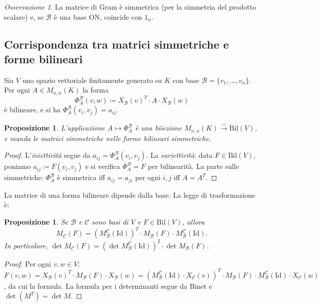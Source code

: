 \documentclass[11pt, a4paper]{book}
\theoremstyle{definition}
\theoremstyle{plain}
\newtheorem{proposizione}[definizione]{Proposizione}
\theoremstyle{remark}
\newtheorem{osservazione}[definizione]{Osservazione}
\newcommand{\Id}{\mathrm{Id}}
\begin{document}
\begin{osservazione}
La matrice di Gram è simmetrica (per la simmetria del prodotto scalare) e, se $\mathcal{B}$ è una base ON, coincide con $1_n$.
\end{osservazione}

\subsection{Corrispondenza tra matrici simmetriche e forme bilineari}

Sia $V$ uno spazio vettoriale finitamente generato su $K$ con base $\mathcal{B} = \{v_1,\ldots,v_n\}$. Per ogni $A \in M_{n,n}(K)$ la forma
\[
  \Phi^{\mathcal{B}}_A(v,w) \coloneqq X_{\mathcal{B}}(v)^T \cdot A \cdot X_{\mathcal{B}}(w)
\]
è bilineare, e si ha $\Phi^{\mathcal{B}}_A(v_i,v_j) = a_{ij}$.

\begin{proposizione}
\label{prop:bilineare-matrice}
L'applicazione $A \mapsto \Phi^{\mathcal{B}}_A$ è una biiezione $M_{n,n}(K) \xrightarrow{\sim} \mathrm{Bil}(V)$, e manda le matrici simmetriche nelle forme bilineari simmetriche.
\end{proposizione}

\begin{proof}
L'\emph{iniettività} segue da $a_{ij} = \Phi^{\mathcal{B}}_A(v_i,v_j)$. La \emph{suriettività}: data $F \in \mathrm{Bil}(V)$, poniamo $a_{ij} \coloneqq F(v_i,v_j)$ e si verifica $\Phi^{\mathcal{B}}_A = F$ per bilinearità. La parte sulle simmetriche: $\Phi^{\mathcal{B}}_A$ è simmetrica iff $a_{ij} = a_{ji}$ per ogni $i,j$ iff $A = A^T$.
\end{proof}

La matrice di una forma bilineare dipende dalla base. La legge di trasformazione è:

\begin{proposizione}
\label{prop:cambio-base-bilineare}
Se $\mathcal{B}$ e $\mathcal{C}$ sono basi di $V$ e $F \in \mathrm{Bil}(V)$, allora
\[
  M_{\mathcal{C}}(F) = (M^{\mathcal{C}}_{\mathcal{B}}(\Id))^T \cdot M_{\mathcal{B}}(F) \cdot M^{\mathcal{C}}_{\mathcal{B}}(\Id).
\]
In particolare, $\det M_{\mathcal{C}}(F) = (\det M^{\mathcal{C}}_{\mathcal{B}}(\Id))^2 \cdot \det M_{\mathcal{B}}(F)$.
\end{proposizione}

\begin{proof}
Per ogni $v,w \in V$: $F(v,w) = X_{\mathcal{B}}(v)^T \cdot M_{\mathcal{B}}(F) \cdot X_{\mathcal{B}}(w) = (M^{\mathcal{C}}_{\mathcal{B}}(\Id)\cdot X_{\mathcal{C}}(v))^T \cdot M_{\mathcal{B}}(F) \cdot M^{\mathcal{C}}_{\mathcal{B}}(\Id)\cdot X_{\mathcal{C}}(w)$, da cui la formula. La formula per i determinanti segue da Binet e $\det(M^T) = \det M$.
\end{proof}
\end{document}
